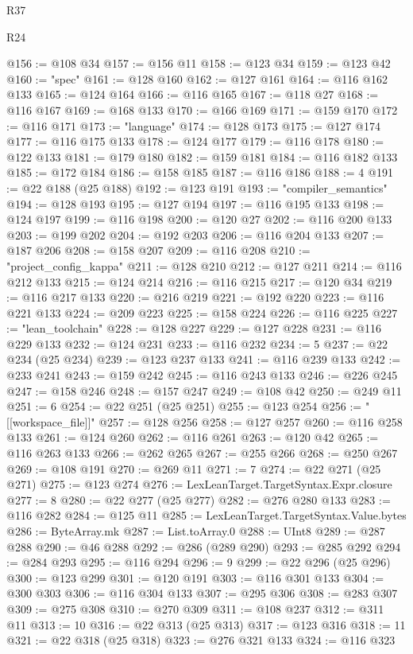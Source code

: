 \begin{lexlean}{R37}
\begin{lexlean}{R24}
\begin{coremodule}
{{{{{{{{{{{{{{{{{{{{{{{{{{{{{{{{{{{{{{{{{{{{{{{{{{{{{{{{{{{{{{{{{{{{{{{{{{{{{{{{{{{{{{{{{{{{{{{{{{{{{{{{{{{{{{{{{{{{{{{{{{{{{{{{{{{{{{{{{{{{{{{{{{{{{{{{{{{{{{{{{{{{{{{{{{{{{{{{{{{{{{{{{@156 := @108 @34
@157 := @156 @11
@158 := @123 @34
@159 := @123 @42
@160 := "spec"
@161 := @128 @160
@162 := @127 @161
@164 := @116 @162 @133
@165 := @124 @164
@166 := @116 @165
@167 := @118 @27
@168 := @116 @167
@169 := @168 @133
@170 := @166 @169
@171 := @159 @170
@172 := @116 @171
@173 := "language"
@174 := @128 @173
@175 := @127 @174
@177 := @116 @175 @133
@178 := @124 @177
@179 := @116 @178
@180 := @122 @133
@181 := @179 @180
@182 := @159 @181
@184 := @116 @182 @133
@185 := @172 @184
@186 := @158 @185
@187 := @116 @186
@188 := 4
@191 := @22 @188 (@25 @188)
@192 := @123 @191
@193 := "compiler_semantics"
@194 := @128 @193
@195 := @127 @194
@197 := @116 @195 @133
@198 := @124 @197
@199 := @116 @198
@200 := @120 @27
@202 := @116 @200 @133
@203 := @199 @202
@204 := @192 @203
@206 := @116 @204 @133
@207 := @187 @206
@208 := @158 @207
@209 := @116 @208
@210 := "project_config_kappa"
@211 := @128 @210
@212 := @127 @211
@214 := @116 @212 @133
@215 := @124 @214
@216 := @116 @215
@217 := @120 @34
@219 := @116 @217 @133
@220 := @216 @219
@221 := @192 @220
@223 := @116 @221 @133
@224 := @209 @223
@225 := @158 @224
@226 := @116 @225
@227 := "lean_toolchain"
@228 := @128 @227
@229 := @127 @228
@231 := @116 @229 @133
@232 := @124 @231
@233 := @116 @232
@234 := 5
@237 := @22 @234 (@25 @234)
@239 := @123 @237 @133
@241 := @116 @239 @133
@242 := @233 @241
@243 := @159 @242
@245 := @116 @243 @133
@246 := @226 @245
@247 := @158 @246
@248 := @157 @247
@249 := @108 @42
@250 := @249 @11
@251 := 6
@254 := @22 @251 (@25 @251)
@255 := @123 @254
@256 := "[[workspace_file]]"
@257 := @128 @256
@258 := @127 @257
@260 := @116 @258 @133
@261 := @124 @260
@262 := @116 @261
@263 := @120 @42
@265 := @116 @263 @133
@266 := @262 @265
@267 := @255 @266
@268 := @250 @267
@269 := @108 @191
@270 := @269 @11
@271 := 7
@274 := @22 @271 (@25 @271)
@275 := @123 @274
@276 := LexLeanTarget.TargetSyntax.Expr.closure
@277 := 8
@280 := @22 @277 (@25 @277)
@282 := @276 @280 @133
@283 := @116 @282
@284 := @125 @11
@285 := LexLeanTarget.TargetSyntax.Value.bytes
@286 := ByteArray.mk
@287 := List.toArray.{0}
@288 := UInt8
@289 := @287 @288
@290 := @46 @288
@292 := @286 (@289 @290)
@293 := @285 @292
@294 := @284 @293
@295 := @116 @294
@296 := 9
@299 := @22 @296 (@25 @296)
@300 := @123 @299
@301 := @120 @191
@303 := @116 @301 @133
@304 := @300 @303
@306 := @116 @304 @133
@307 := @295 @306
@308 := @283 @307
@309 := @275 @308
@310 := @270 @309
@311 := @108 @237
@312 := @311 @11
@313 := 10
@316 := @22 @313 (@25 @313)
@317 := @123 @316
@318 := 11
@321 := @22 @318 (@25 @318)
@323 := @276 @321 @133
@324 := @116 @323
}}}}}}}}}}}}}}}}}}}}}}}}}}}}}}}}}}}}}}}}}}}}}}}}}}}}}}}}}}}}}}}}}}}}}}}}}}}}}}}}}}}}}}}}}}}}}}}}}}}}}}}}}}}}}}}}}}}}}}}}}}}}}}}}}}}}}}}}}}}}}}}}}}}}}}}}}}}}}}}}}}}}}}}}}}}}}}}}}}}}}}}}}
\end{coremodule}
\end{lexlean}
\end{lexlean}

